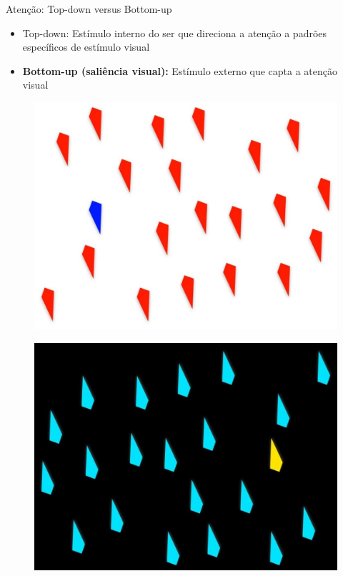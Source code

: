 \documentclass[10pt]{beamer}
\newcommand{\tbf}[1]{\textbf{#1}}
\begin{document}
\begin{frame}{Atenção: Top-down versus Bottom-up}
    \begin{itemize}[<+->]
        \item Top-down: Estímulo interno do ser que direciona a atenção
            a padrões específicos de estímulo visual
        \item \tbf{Bottom-up (saliência visual):}
            Estímulo externo que capta a atenção visual
    \end{itemize}
\end{frame}

\begin{frame}{}
    \begin{figure}
        \centering
        \includegraphics[width=0.8\linewidth]{./img/syntheticData2.jpg}
    \end{figure}
\end{frame}

\begin{frame}{}
    \begin{figure}
        \centering
        \includegraphics[width=0.8\linewidth]{./img/syntheticData5.jpg}
    \end{figure}
\end{frame}
\end{document}
